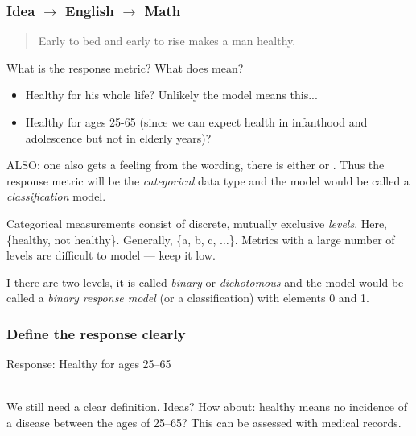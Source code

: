 \documentclass[handout]{beamer}
\begin{document}
\begin{frame}\frametitle{Idea $\rightarrow$ English $\rightarrow$ Math}

\small
\begin{quotation}
Early to bed and early to rise makes a man healthy.
\end{quotation}

What is the response metric? \pause What does  mean?\\

\begin{itemize}
\item Healthy for his whole life? \pause Unlikely the model means this... \pause 
\item Healthy for ages 25-65 (since we can expect health in infanthood and adolescence but not in elderly years)?
\end{itemize}

ALSO: one also gets a feeling from the wording, there is either  or . \pause  Thus the response metric will be the \textit{categorical} data type and the model would be called a \textit{classification} model. \\\vspace{0.2cm} \pause 

Categorical measurements consist of discrete, mutually exclusive \textit{levels}. Here, \{healthy, not healthy\}.  \pause Generally, \{a, b, c, $\ldots$\}. Metrics with a large number of levels are difficult to model --- keep it low.\\\vspace{0.2cm} \pause 

I there are two levels, it is called \textit{binary} or \textit{dichotomous} and the model would be called a \textit{binary response model} (or a classification) with elements 0 and 1.
	
\end{frame}

\begin{frame}\frametitle{Define the response clearly}

Response: Healthy for ages 25--65 \\~\\ \pause 

We still need a clear definition. Ideas?  \pause How about: healthy means no incidence of a  disease between the ages of 25--65? This can be assessed with medical records. 
	
\end{frame}
\end{document}
